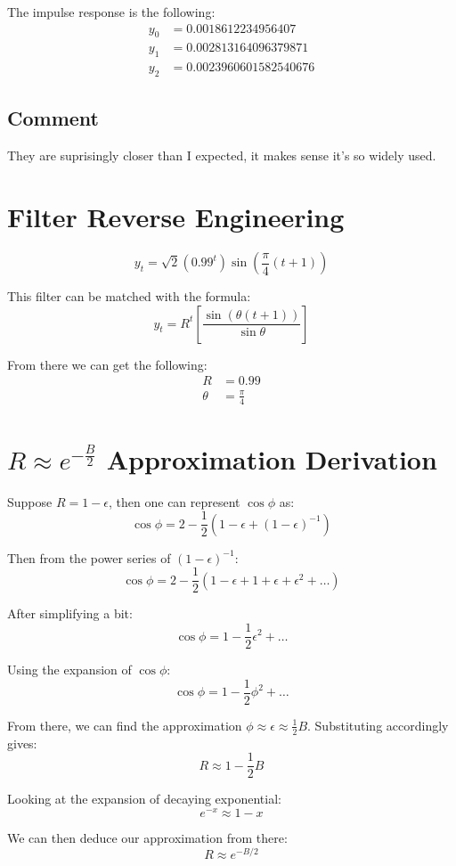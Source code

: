 \documentclass{article}
\begin{document}
The impulse response is the following:
\begin{align*}
	y_0 & = 0.0018612234956407    \\
	y_1 & = 0.002813164096379871  \\
	y_2 & = 0.0023960601582540676
\end{align*}

\subsection{Comment}
They are suprisingly closer than I expected, it makes sense it's so widely used.

\section{Filter Reverse Engineering}
$$
	y_t = \sqrt{2}(0.99^t)\sin(\frac{\pi}{4}(t+1))
$$

This filter can be matched with the formula:
$$
	y_t = R^t[\frac{\sin(\theta(t+1))}{\sin\theta}]
$$

From there we can get the following:
\begin{align*}
	R      & = 0.99          \\
	\theta & = \frac{\pi}{4}
\end{align*}

\section{$R \approx e^{-\frac{B}{2}}$ Approximation Derivation}
Suppose $R = 1 - \epsilon$, then one can represent $\cos\phi$ as:
$$
	\cos\phi = 2 - \frac{1}{2}(1 - \epsilon + (1 - \epsilon)^{-1})
$$

Then from the power series of $(1 - \epsilon)^{-1}$:
$$
	\cos\phi = 2 - \frac{1}{2}(1 - \epsilon + 1 + \epsilon + \epsilon^2 + \dots)
$$

After simplifying a bit:
$$
	\cos\phi = 1 - \frac{1}{2}\epsilon^2 + \dots
$$

Using the expansion of $\cos \phi$:
$$
	\cos\phi = 1 - \frac{1}{2}\phi^2 + \dots
$$

From there, we can find the approximation $\phi \approx \epsilon \approx \frac{1}{2}B$.
Substituting accordingly gives:
$$
	R \approx 1 - \frac{1}{2}B
$$

Looking at the expansion of decaying exponential:
$$
	e^{-x} \approx 1 - x
$$

We can then deduce our approximation from there:
$$
	R \approx e^{-B/2}
$$
\end{document}
